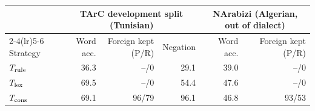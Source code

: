 \begin{tabular}{@{}lrrrrr@{}}\toprule
 & \multicolumn{3}{c}{TArC development split (Tunisian)} & \multicolumn{2}{c}{NArabizi (Algerian, out of dialect)}\\\cmidrule(lr){2-4}\cmidrule(lr){5-6}
Strategy & Word acc. & Foreign kept (P/R) & Negation & Word acc. & Foreign kept (P/R)\\\midrule
$T_{\rm rule}$ & 36.3 & --/0 & 29.1 & 39.0 & --/0\\
$T_{\rm lex}$ & 69.5 & --/0 & 54.4 & 47.6 & --/0\\
$T_{\rm cons}$ & 69.1 & 96/79 & 96.1 & 46.8 & 93/53\\
\bottomrule\end{tabular}

